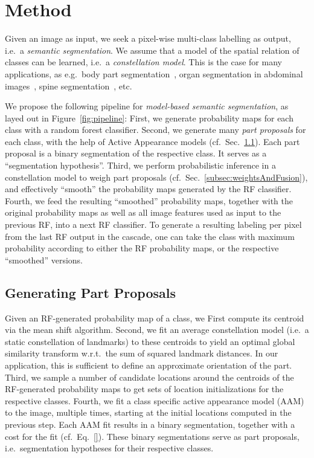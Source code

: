 \documentclass[10pt,twocolumn,letterpaper]{article}
\begin{document}
\section{Method}
Given an image as input, we seek a pixel-wise multi-class labelling as output, i.e.\ a \emph{semantic segmentation}. 
%
We assume that a model of the spatial relation of classes can be learned, i.e.\ a \emph{constellation model}. This is the case for many applications, as e.g.\ body part segmentation~\cite{PoseMachines2014}, organ segmentation in abdominal images~\cite{SeifertAnatomicalSPIE2009}, spine segmentation~\cite{Glocker2012,Glocker2013}, etc. 
%

We propose the following pipeline for \emph{model-based semantic segmentation}, as layed out in Figure~\ref{fig:pipeline}: 
%
First, we generate probability maps for each class with a random forest classifier.
%
Second, we generate many \emph{part proposals} for each class, with the help of Active Appearance models (cf.\ Sec.\ \ref{subsec:hyps}). 
Each part proposal is a binary segmentation of the respective class. It serves as a ``segmentation hypothesis''. 
%
Third, we perform probabilistic inference in a constellation model to weigh part proposals (cf.\ Sec.\ \ref{subsec:weightsAndFusion}), and effectively ``smooth'' the probability maps generated by the RF classifier.  
%
Fourth, we feed the resulting ``smoothed'' probability maps, together with the original probability maps as well as all image features used as input to the previous RF, into a next RF classifier. 
%
To generate a resulting labeling per pixel from the last RF output in the cascade, one can take the class with maximum probability according to either the RF probability maps, or the respective ``smoothed'' versions. 


\subsection{Generating Part Proposals}
\label{subsec:hyps}
%
Given an RF-generated probability map of a class, we
First compute its centroid via the mean shift algorithm. 
%
Second, we fit an average constellation model (i.e.\ a static constellation of landmarks) to these centroids to yield an optimal global similarity transform w.r.t.\ the sum of squared landmark distances. In our application, this is sufficient to define an approximate orientation of the part. 
%
Third, we sample a number of candidate locations around the centroids of the RF-generated probability maps to get sets of location initializations for the respective classes. 
%
Fourth, we fit a class specific active appearance model (AAM) to the image, multiple times, starting at the initial locations computed in the previous step. 
%
Each AAM fit results in a binary segmentation, together with a cost for the fit (cf.\ Eq.\ \eqref{}). 
%
These binary segmentations serve as part proposals, i.e.\ segmentation hypotheses for their respective classes. 
\end{document}
